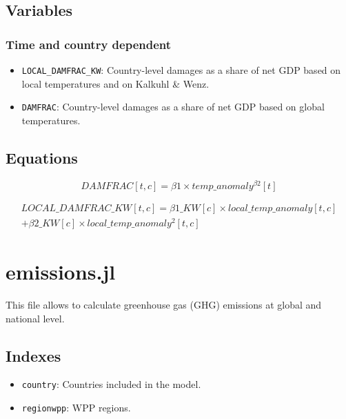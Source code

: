 \documentclass[
]{article}
\providecommand{\tightlist}{%
  \setlength{\itemsep}{0pt}\setlength{\parskip}{0pt}}
\begin{document}
\subsection{Variables}\label{variables-1}

\subsubsection{Time and country
dependent}\label{time-and-country-dependent-3}

\begin{itemize}
\tightlist
\item
  \texttt{LOCAL\_DAMFRAC\_KW}: Country-level damages as a share of net
  GDP based on local temperatures and on Kalkuhl \& Wenz.
\item
  \texttt{DAMFRAC}: Country-level damages as a share of net GDP based on
  global temperatures.
\end{itemize}

\subsection{Equations}\label{equations-1}

\begin{equation}
 DAMFRAC[t,c] = \beta1 \times temp\_anomaly^ {\beta2}[t] 
\end{equation}


\begin{multline}
 LOCAL\_DAMFRAC\_KW[t,c] = \beta1\_KW[c] \times local\_temp\_anomaly[t,c] \\
 + \beta2\_KW[c] \times local\_temp\_anomaly^2[t,c]
\end{multline}


\section{emissions.jl}\label{emissions.jl}

This file allows to calculate greenhouse gas (GHG) emissions at global
and national level.

\subsection{Indexes}\label{indexes-2}

\begin{itemize}
\tightlist
\item
  \texttt{country}: Countries included in the model.
\item
  \texttt{regionwpp}: WPP regions.
\end{itemize}
\end{document}

